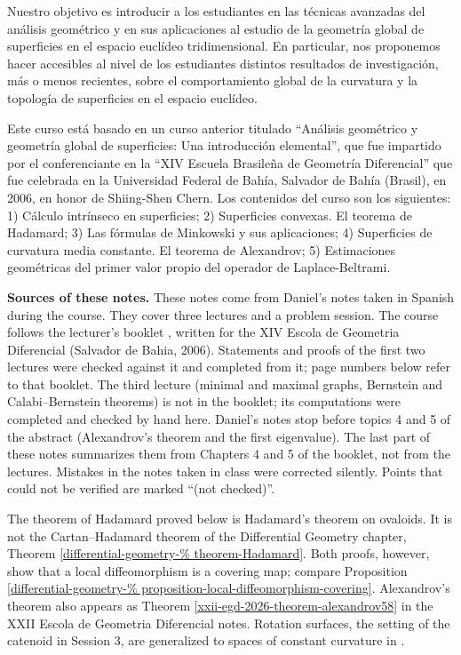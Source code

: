 Nuestro objetivo es introducir a los
estudiantes en las técnicas avanzadas del
análisis geométrico y en sus aplicaciones al
estudio de la geometría global de superficies
en el espacio euclídeo tridimensional. En
particular, nos proponemos hacer accesibles
al nivel de los estudiantes distintos
resultados de investigación, más o menos
recientes, sobre el comportamiento global de
la curvatura y la topología de superficies en
el espacio euclídeo.

Este curso está basado en un curso anterior
titulado ``Análisis geométrico y geometría
global de superficies: Una introducción
elemental'', que fue impartido por el
conferenciante en la ``XIV Escuela Brasileña
de Geometría Diferencial'' que fue celebrada
en la Universidad Federal de Bahía, Salvador
de Bahía (Brasil), en 2006, en honor de
Shiing-Shen Chern. Los contenidos del curso
son los siguientes: 1) Cálculo intrínseco en
superficies; 2) Superficies convexas. El
teorema de Hadamard; 3) Las fórmulas de
Minkowski y sus aplicaciones; 4) Superficies
de curvatura media constante. El teorema de
Alexandrov; 5) Estimaciones geométricas del
primer valor propio del operador de
Laplace-Beltrami.

\medskip\noindent
{\bf Sources of these notes.}
These notes come from Daniel's notes taken
in Spanish during the course. They cover
three lectures and a problem session.
The course follows the lecturer's
booklet \cite{alias2006analisis}, written
for the XIV Escola de Geometria
Diferencial (Salvador de Bahia, 2006).
Statements and proofs of the first two
lectures were checked against it and
completed from it; page numbers below
refer to that booklet. The third lecture
(minimal and maximal graphs, Bernstein and
Calabi--Bernstein theorems) is not in the
booklet; its computations were completed
and checked by hand here. Daniel's notes
stop before topics 4 and 5 of the abstract
(Alexandrov's theorem and the first
eigenvalue). The last part of these notes
summarizes them from Chapters 4 and 5 of
the booklet, not from the lectures.
Mistakes in the notes taken in class were
corrected silently. Points that could not
be verified are marked ``(not checked)''.

The theorem of Hadamard proved below is
Hadamard's theorem on ovaloids. It is not
the Cartan--Hadamard theorem of the
Differential Geometry chapter, Theorem
\ref{differential-geometry-%
theorem-Hadamard}. Both proofs, however,
show that a local diffeomorphism is a
covering map; compare Proposition
\ref{differential-geometry-%
proposition-local-diffeomorphism-covering}.
Alexandrov's theorem also appears as
Theorem
\ref{xxii-egd-2026-theorem-alexandrov58}
in the XXII Escola de Geometria
Diferencial notes. Rotation surfaces, the
setting of the catenoid in Session 3, are
generalized to spaces of constant
curvature in \cite{docarmo1983rotation}.


